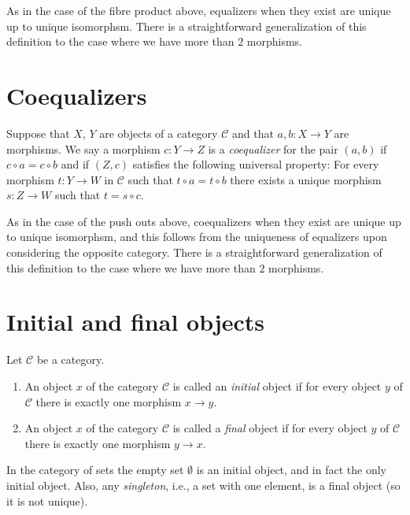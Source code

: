 \noindent
As in the case of the fibre product above, equalizers when
they exist are unique up to unique isomorphsm. There is a
straightforward generalization of this definition to the
case where we have more than $2$ morphisms.

\section{Coequalizers}
\label{section-coequalizers}

\begin{definition}
\label{definition-coequalizers}
Suppose that $X$, $Y$ are objects of a category $\mathcal{C}$
and that $a, b : X \to Y$ are morphisms. We say a morphism
$c : Y \to Z$ is a {\it coequalizer} for the pair $(a,b)$ if
$c \circ a = c \circ b$ and if $(Z,c)$ satisfies the following
universal property: For every morphism $t : Y \to W$
in $\mathcal{C}$ such that $t \circ a = t \circ b$ there exists
a unique morphism $s : Z \to W$ such that $t = s \circ c$.
\end{definition}

\noindent
As in the case of the push outs above, coequalizers when
they exist are unique up to unique isomorphsm, and this follows
from the uniqueness of equalizers upon considering the opposite
category. There is a straightforward generalization of this definition
to the case where we have more than $2$ morphisms.

\section{Initial and final objects}
\label{label-initial-final}

\begin{definition}
\label{definition-initial-final}
Let $\mathcal{C}$ be a category.
\begin{enumerate}
\item An object $x$ of the category $\mathcal{C}$ is called
an {\it initial} object if for every object $y$ of $\mathcal{C}$
there is exactly one morphism $x \to y$.
\item An object $x$ of the category $\mathcal{C}$ is called
a {\it final} object if for every object $y$ of $\mathcal{C}$
there is exactly one morphism $y \to x$.
\end{enumerate}
\end{definition}

\noindent
In the category of sets the empty set $\emptyset$ is an
initial object, and in fact the only initial object.
Also, any {\it singleton}, i.e., a set with one element,
is a final object (so it is not unique).


